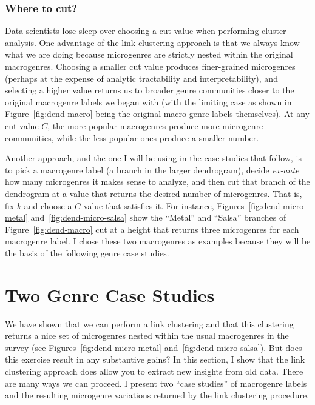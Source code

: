 \documentclass[a4paper,12pt]{article}
\begin{document}
\subsubsection{Where to cut?}
Data scientists lose sleep over choosing a cut value when performing cluster analysis. One advantage of the link clustering approach is that we always know what we are doing because microgenres are strictly nested within the original macrogenres. Choosing a smaller cut value produces finer-grained microgenres (perhaps at the expense of analytic tractability and interpretability), and selecting a higher value returns us to broader genre communities closer to the original macrogenre labels we began with (with the limiting case as shown in Figure~\ref{fig:dend-macro} being the original macro genre labels themselves). At any cut value $C$, the more popular macrogenres produce more microgenre communities, while the less popular ones produce a smaller number. 

Another approach, and the one I will be using in the case studies that follow, is to pick a macrogenre label (a branch in the larger dendrogram), decide \textit{ex-ante} how many microgenres it makes sense to analyze, and then cut that branch of the dendrogram at a value that returns the desired number of microgenres. That is, fix $k$ and choose a $C$ value that satisfies it. For instance, Figures~\ref{fig:dend-micro-metal} and~\ref{fig:dend-micro-salsa} show the ``Metal'' and ``Salsa'' branches of Figure~\ref{fig:dend-macro} cut at a height that returns three microgenres for each macrogenre label. I chose these two macrogenres as examples because they will be the basis of the following genre case studies. 
 
\section{Two Genre Case Studies}
We have shown that we can perform a link clustering and that this clustering returns a nice set of microgenres nested within the usual macrogenres in the survey (see Figures~\ref{fig:dend-micro-metal} and~\ref{fig:dend-micro-salsa}). But does this exercise result in any substantive gains? In this section, I show that the link clustering approach does allow you to extract new insights from old data. There are many ways we can proceed. I present two ``case studies'' of macrogenre labels and the resulting microgenre variations returned by the link clustering procedure. 
\end{document}
